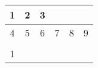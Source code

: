 \begin{tabular}{|c|c|c|c|c|c|}
\hline 
1 & 2 & 3 &  &  &  \\ 
\hline 
4 & 5 & 6 & 7 & 8 & 9 \\ 
\hline 
 &  &  &  &  &  \\ 
\hline 
1 &  &  &  &  &  \\ 
\hline\end{tabular}
